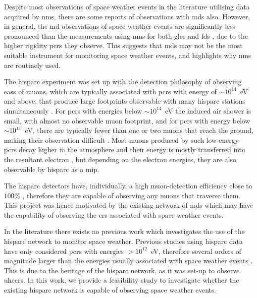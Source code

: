 Despite most observations of space weather events in the literature utilising data acquired by \glspl{nm}, there are some reports of observations with \glspl{md} also. However, in general, the \gls{md} observations of space weather events are significantly less pronounced than the measurements using \glspl{nm} for both \glspl{gle} \citep{timashkov_ground_2008, augusto_signals_2016} and \glspl{fd} \citep{braun_forbush_2009, rockenbach_global_2014}, due to the higher rigidity \glspl{pcr} they observe. This suggests that \glspl{md} may not be the most suitable instrument for monitoring space weather events, and highlights why \glspl{nm} are routinely used.

The \gls{hisparc} experiment was set up with the detection philosophy of observing \glspl{eas} of muons, which are typically associated with \glspl{pcr} with energy of $\sim10^{14}$~eV and above, that produce large footprints observable with many \gls{hisparc} stations simultaneously \citep{fokkema_hisparc_2012, bartels_hisparc_2012, van_dam_hisparc_2020}. For \glspl{pcr} with energies below $\sim10^{14}$~eV the induced air shower is small, with almost no observable muon footprint, and for \glspl{pcr} with energy below $\sim10^{11}$~eV, there are typically fewer than one or two muons that reach the ground, making their observation difficult \citep{van_dam_hisparc_2020}. Most muons produced by such low-energy \glspl{pcr} decay higher in the atmosphere and their energy is mostly transferred into the resultant electron \citep{van_dam_hisparc_2020}, but depending on the electron energies, they are also observable by \gls{hisparc} as a \gls{mip}.

The \gls{hisparc} detectors have, individually, a high muon-detection
efficiency close to $100\%$ \citep{van_dam_hisparc_2020}, therefore they are capable of observing any muons that traverse them. This project was hence motivated by the existing network of \glspl{md} which may have the capability of observing the \glspl{cr} associated with space weather events.

In the literature there exists no previous work which investigates the use of the \gls{hisparc} network to monitor space weather. Previous studies using \gls{hisparc} data have only considered \glspl{pcr} with energies $> 10^{12}$~eV, therefore several orders of magnitude larger than the energies usually associated with space weather events \citep{bartels_hisparc_2012, van_dam_probing_2020}. This is due to the heritage of the \gls{hisparc} network, as it was set-up to observe \glspl{uhecr}. In this work, we provide a feasibility study to investigate whether the existing \gls{hisparc} network is capable of observing space weather events. 


